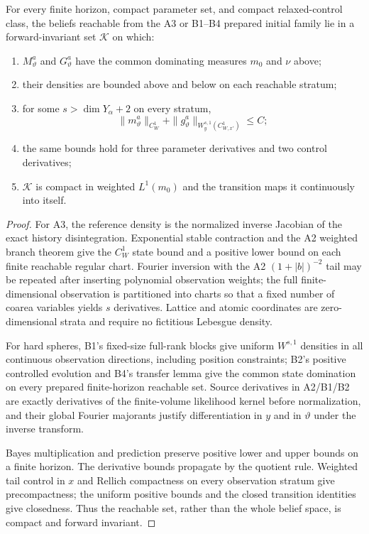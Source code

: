 \begin{theorem}
\label{thm:r21-c1-chart}
For every finite horizon, compact parameter set, and compact relaxed-control
class, the beliefs reachable from the A3 or B1--B4 prepared initial family lie
in a forward-invariant set $\mathcal K$ on which:
\begin{enumerate}[label=(\roman*)]
\item $M_\vartheta^a$ and $G_\vartheta^a$ have the common dominating measures
      $m_0$ and $\nu$ above;
\item their densities are bounded above and below on each reachable stratum;
\item for some $s>\dim Y_\alpha+2$ on every stratum,
\[
 \|m_\vartheta^a\|_{C_W^1}+
 \|g_\vartheta^a\|_{W_y^{s,1}(C_{W,x'}^1)}\le C;
\]
\item the same bounds hold for three parameter derivatives and two control
      derivatives;
\item $\mathcal K$ is compact in weighted $L^1(m_0)$ and the transition maps
      it continuously into itself.
\end{enumerate}
\end{theorem}

\begin{proof}
For A3, the reference density is the normalized inverse Jacobian of the exact
history disintegration.  Exponential stable contraction and the A2 weighted
branch theorem give the $C_W^1$ state bound and a positive lower bound on each
finite reachable regular chart.  Fourier inversion with the A2
$(1+|b|)^{-2}$ tail may be repeated after inserting polynomial observation
weights; the full finite-dimensional observation is partitioned into charts
so that a fixed number of coarea variables yields $s$ derivatives.  Lattice
and atomic coordinates are zero-dimensional strata and require no fictitious
Lebesgue density.

For hard spheres, B1's fixed-size full-rank blocks give uniform
$W^{s,1}$ densities in all continuous observation directions, including
position constraints; B2's positive controlled evolution and B4's transfer
lemma give the common state domination on every prepared finite-horizon
reachable set.  Source derivatives in A2/B1/B2 are exactly derivatives of the
finite-volume likelihood kernel before normalization, and their global
Fourier majorants justify differentiation in $y$ and in $\vartheta$ under the
inverse transform.

Bayes multiplication and prediction preserve positive lower and upper bounds
on a finite horizon.  The derivative bounds propagate by the quotient rule.
Weighted tail control in $x$ and Rellich compactness on every observation
stratum give precompactness; the uniform positive bounds and the closed
transition identities give closedness.  Thus the reachable set, rather than
the whole belief space, is compact and forward invariant.
\end{proof}

